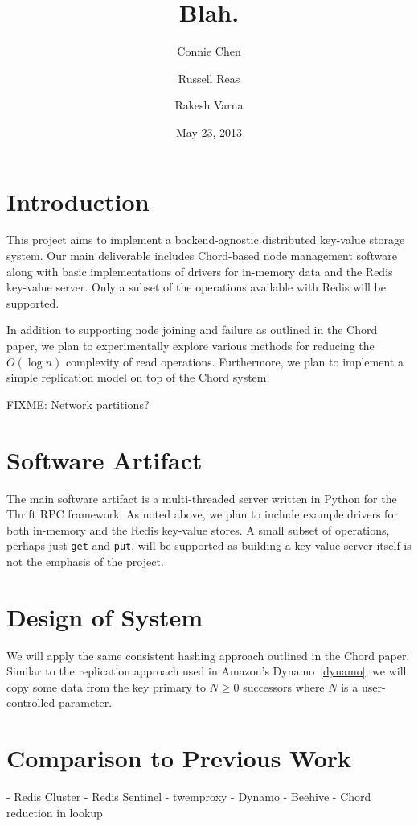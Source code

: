 \documentclass[12pt]{article}
\title{Blah.}
\author{Connie Chen \and Russell Reas \and Rakesh Varna}
\date{May 23, 2013}
\begin{document}
\maketitle

\section{Introduction}

This project aims to implement a backend-agnostic distributed key-value storage system.  Our main deliverable includes Chord-based node management software along with basic implementations of drivers for in-memory data and the Redis key-value server.  Only a subset of the operations available with Redis will be supported.

In addition to supporting node joining and failure as outlined in the Chord paper, we plan to experimentally explore various methods for reducing the $O(\log n)$ complexity of read operations.  Furthermore, we plan to implement a simple replication model on top of the Chord system.

FIXME: Network partitions?

\section{Software Artifact}

The main software artifact is a multi-threaded server written in Python for the Thrift RPC framework.  As noted above, we plan to include example drivers for both in-memory and the Redis key-value stores.  A small subset of operations, perhaps just {\tt get} and {\tt put}, will be supported as building a key-value server itself is not the emphasis of the project.  

\section{Design of System}

We will apply the same consistent hashing approach outlined in the Chord paper.  Similar to the replication approach used in Amazon's Dynamo~\ref{dynamo}, we will copy some data from the key primary to $N \ge 0$ successors where $N$ is a user-controlled parameter.



\section{Comparison to Previous Work}
- Redis Cluster
- Redis Sentinel
- twemproxy
- Dynamo
- Beehive
- Chord reduction in lookup
\end{document}
